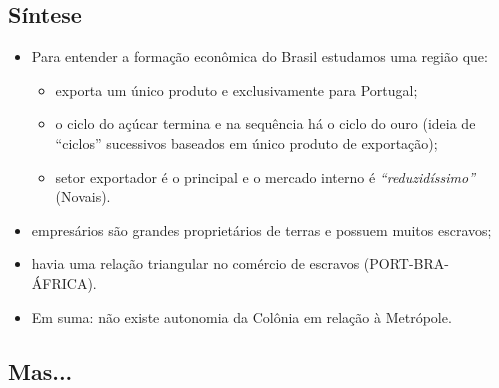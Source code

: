 \documentclass[a4paper,12pt]{article}[abntex2]
\begin{document}
\subsection{\textbf{Síntese}}

\begin{itemize}
    \item Para entender a formação econômica do Brasil estudamos uma região que:
    \begin{itemize}
        \item exporta um único produto e exclusivamente para Portugal;
        \item o ciclo do açúcar termina e na sequência há o ciclo do ouro (ideia de “ciclos” sucessivos baseados em único produto de exportação);
        \item setor exportador é o principal e o mercado interno é \textit{“reduzidíssimo”} (Novais).
    \end{itemize}
\end{itemize}

\begin{itemize}
    \item empresários são grandes proprietários de terras e possuem muitos escravos;
    \item havia uma relação triangular no comércio de escravos (PORT-BRA-ÁFRICA).
\end{itemize}

\begin{itemize}
    \item Em suma: não existe autonomia da Colônia em relação à Metrópole.
\end{itemize}

\subsection{\textbf{Mas...}}
\end{document}
